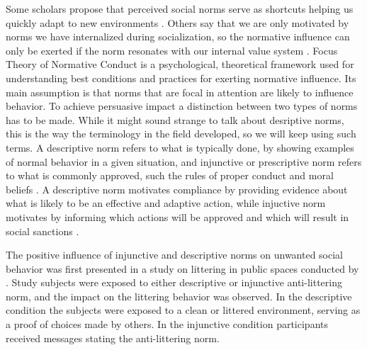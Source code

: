 \documentclass[preprint,12pt]{elsarticle}
\begin{document}


Some scholars propose that perceived social norms serve as shortcuts helping us quickly adapt to new environments \citep{cialdini1990focus}. Others say that we are only motivated by norms we have internalized during socialization, so the normative influence can only be exerted if the norm resonates with our internal value system \citep{morris2018common}.  Focus Theory of Normative Conduct \citep{kallgren2000focus} is a psychological, theoretical framework used for understanding best conditions and practices for exerting normative influence. Its main assumption is that norms that are focal in attention are likely to influence behavior.  %
To achieve persuasive impact a distinction between two types of norms has to be made. While it might sound strange to talk about desriptive norms, this is the way the terminology in the field developed, so we will keep using such terms.  A descriptive norm refers to what is typically done, by showing  examples of  normal behavior in a given situation, and injunctive or prescriptive norm refers to what is commonly approved, such the rules of proper conduct and moral beliefs \citep{cialdini1990focus}.  A descriptive norm motivates compliance by providing evidence about what is likely to be an effective and adaptive action, while injuctive norm motivates by informing which actions will be approved and which will result in social sanctions \citep{yanowitzky2006communication, cialdini2004social, kallgren2000focus}. 


The positive influence of injunctive and descriptive norms on unwanted social behavior was first presented in a study on littering in public spaces conducted by \citet{cialdini1990focus}. Study subjects were exposed to either descriptive or injunctive anti-littering norm, and the impact on the littering behavior was observed. In the descriptive condition the subjects were exposed to a clean or littered environment, serving as a proof of choices made by others. In the injunctive condition participants received messages stating the anti-littering norm.
\end{document}
